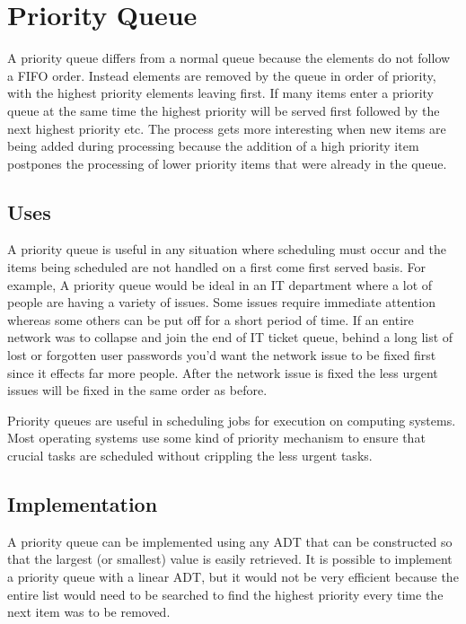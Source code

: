 

\chapter{Priority Queue}

A priority queue differs from a normal queue because the elements do not follow a FIFO order. Instead elements are removed by the queue in order of priority, with the highest priority elements leaving first. If many items enter a priority queue at the same time the highest priority will be served first followed by the next highest priority etc. The process gets more interesting when new items are being added during processing because the addition of a high priority item postpones the processing of lower priority items that were  already in the queue.

\section{Uses}
A priority queue is useful in any situation where scheduling must occur and the items being scheduled are not handled on a first come first served basis.   For example,  A priority queue would be ideal in an IT department where a lot of people are having a variety of issues. Some issues require immediate attention whereas some others can be put off for a short period of time.  If an entire network was to collapse and join the end of IT ticket queue, behind a long list of lost or forgotten user passwords you'd want the network issue to be fixed first since it effects far more people. After the network issue is fixed the less urgent issues will be fixed in the same order as before.

Priority queues are useful in scheduling jobs for execution on computing systems.   Most operating systems use some kind of priority mechanism to ensure that crucial tasks are scheduled without crippling the less urgent tasks.  


\section{Implementation}

A priority queue can be implemented using any ADT that can be constructed so that the largest (or smallest) value is easily retrieved.  
It is possible to implement a priority queue with a linear ADT, but it would not be very efficient because the entire list would need to be searched to find the highest priority every time the next item was to be removed. 

